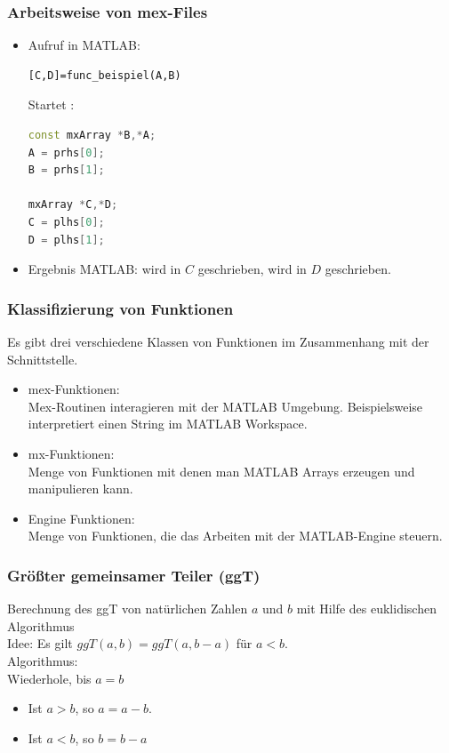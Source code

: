 \documentclass[hyperref={xetex}]{beamer}
\begin{document}
%
%
\begin{frame}[fragile]\frametitle{Arbeitsweise von mex-Files}
\begin{itemize}
\item Aufruf in MATLAB:
\begin{lstlisting}
[C,D]=func_beispiel(A,B)
\end{lstlisting}
Startet :
\begin{lstlisting}[language=C++]
const mxArray *B,*A;
A = prhs[0];
B = prhs[1];

mxArray *C,*D;
C = plhs[0];
D = plhs[1];
\end{lstlisting} 
\item Ergebnis MATLAB:  wird in $C$ geschrieben, 
  wird in $D$ geschrieben. 
\end{itemize}
\end{frame}

%
% 
\begin{frame}[fragile]\frametitle{Klassifizierung von Funktionen}
\vspace*{-0.5cm}
Es gibt drei verschiedene Klassen von Funktionen im Zusammenhang mit der Schnittstelle.
\begin{itemize}
\item \alert{ mex-Funktionen:}\\
 Mex-Routinen interagieren mit der MATLAB Umgebung. 
Beispielsweise interpretiert  einen String im MATLAB Workspace.  
\item \alert{ mx-Funktionen:} \\
Menge von Funktionen mit 
 denen man MATLAB Arrays erzeugen und manipulieren kann. 
\item \alert{ Engine Funktionen:}\\ 
 Menge von Funktionen, die das Arbeiten mit der MATLAB-Engine steuern. 
\end{itemize}
\end{frame}
%
%
%
\begin{frame}[fragile]\frametitle{Gr\"o{\ss}ter gemeinsamer Teiler (ggT)}
Berechnung des ggT von nat\"urlichen Zahlen $a$ und $b$ mit Hilfe des
euklidischen Algorithmus\\[1cm]

\alert{Idee:} Es gilt \alert{ $ggT(a,b)=ggT(a,b-a)$} f\"ur $a<b$.\\[1cm]

\alert{Algorithmus:} \\
Wiederhole,  bis $a=b$
\begin{itemize}
\item Ist $a>b$, so $a=a-b$.
\item Ist $a<b$, so $b=b-a$ 
\end{itemize}
\end{frame}
\end{document}
